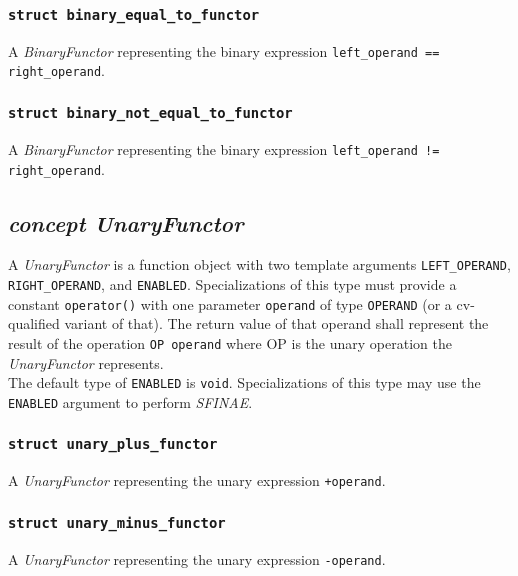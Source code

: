 \documentclass[oneside]{article}
\begin{document}
\subsubsection{\texttt{struct binary\_equal\_to\_functor}}
A \textit{BinaryFunctor} representing the binary expression \verb|left_operand == right_operand|.

\subsubsection{\texttt{struct binary\_not\_equal\_to\_functor}}
A \textit{BinaryFunctor} representing the binary expression \verb|left_operand != right_operand|.

\subsection{\textit{concept UnaryFunctor}}
A \textit{UnaryFunctor} is a function object with two template arguments \verb+LEFT_OPERAND+,
\verb+RIGHT_OPERAND+, and \verb+ENABLED+. Specializations of this type must provide a
constant \verb+operator()+ with one parameter \verb+operand+ of type \verb+OPERAND+
(or a cv-qualified variant of that). The return value of that operand shall represent the
result of the operation \verb+OP operand+ where OP is the unary operation
the \textit{UnaryFunctor} represents.\\

\noindent{}The default type of \verb+ENABLED+ is \verb+void+. Specializations of this type may use
the \verb+ENABLED+ argument to perform \textit{SFINAE}.

\subsubsection{\texttt{struct unary\_plus\_functor}}
A \textit{UnaryFunctor} representing the unary expression \verb|+operand|.

\subsubsection{\texttt{struct unary\_minus\_functor}}
A \textit{UnaryFunctor} representing the unary expression \verb|-operand|.
\end{document}
